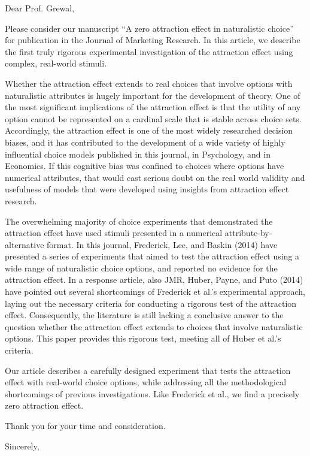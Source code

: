 \documentclass{letter}
\begin{document}
\begin{letter}
{}
\opening{Dear Prof. Grewal,} %

Please consider our manuscript ``A zero attraction effect in naturalistic choice'' for publication in the Journal of Marketing Research. In this article, we describe the first truly rigorous experimental investigation of the attraction effect using complex, real-world stimuli.

Whether the attraction effect extends to real choices that involve options with naturalistic attributes is hugely important for the development of theory. One of the most significant implications of the attraction effect is that the utility of any option cannot be represented on a cardinal scale that is stable across choice sets. Accordingly, the attraction effect is one of the most widely researched decision biases, and it has contributed to the development of a wide variety of highly influential choice models published in this journal, in Psychology, and in Economics. If this cognitive bias was confined to choices where options have numerical attributes, that would cast serious doubt on the real world validity and usefulness of models that were developed using insights from attraction effect research.

The overwhelming majority of choice experiments that demonstrated the attraction effect have used stimuli presented in a numerical attribute-by-alternative format. In this journal, Frederick, Lee, and Baskin (2014) have presented a series of experiments that aimed to test the attraction effect using a wide range of naturalistic choice options, and reported no evidence for the attraction effect. In a response article, also JMR, Huber, Payne, and Puto (2014) have pointed out several shortcomings of Frederick et al.'s experimental approach, laying out the necessary criteria for conducting a rigorous test of the attraction effect. Consequently, the literature is still lacking a conclusive answer to the question whether the attraction effect extends to choices that involve naturalistic options. This paper provides this rigorous test, meeting all of Huber et al.'s criteria.

Our article describes a carefully designed experiment that tests the attraction effect with real-world choice options, while addressing all the methodological shortcomings of previous investigations. Like Frederick et al., we find a precisely zero attraction effect.

Thank you for your time and consideration.

\closing{Sincerely,}



\end{letter}
\end{document}

